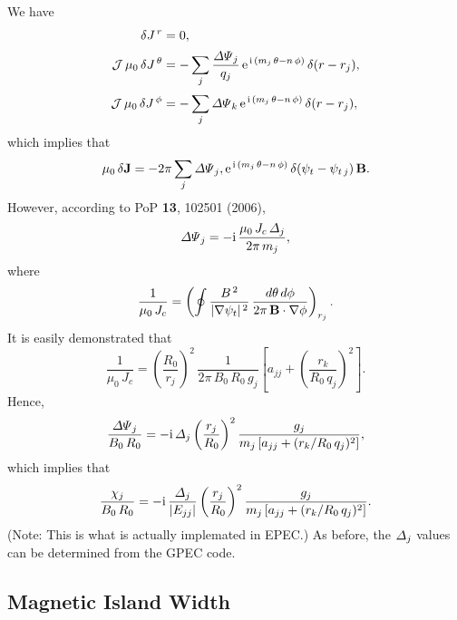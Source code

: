 \documentclass[notitlepage,12pt]{article}
\begin{document}
We have
\begin{align}
\delta J^{\,r} &= 0,\\[0.5ex]
{\cal J}\,\mu_0\,\delta J^{\,\theta} &= -\sum_j \frac{{\mit\Delta\Psi}_j}{q_j}\,{\rm e}^{\,{\rm i}\,(m_j\,\theta-n\,\phi)}\,\delta(r-r_j),\\[0.5ex]
{\cal J}\,\mu_0\,\delta J^{\,\phi} &= -\sum_j {\mit\Delta\Psi}_k\,{\rm e}^{\,{\rm i}\,(m_j\,\theta-n\,\phi)}\,\delta(r-r_j),
\end{align}
which implies that
\begin{equation}
\mu_0\,\delta{\bf J} = -2\pi\sum_j{\mit\Delta\Psi}_j,{\rm e}^{\,{\rm i}\,(m_j\,\theta-n\,\phi)}\,\delta(\psi_t-\psi_{t\,j})\,{\bf B}.
\end{equation}
However, according to PoP {\bf 13}, 102501 (2006),
\begin{equation}
{\mit\Delta\Psi}_j =- {\rm i}\,\frac{\mu_0\,J_c\,{\mit\Delta}_j}{2\pi\,m_j},
\end{equation}
where
\begin{equation}
\frac{1}{\mu_0\,J_c} = \left(\oint \frac{B^{\,2}}{|\nabla\psi_t|^{\,2}}\,\frac{d\theta\,d\phi}{2\pi\,{\bf B}\cdot\nabla\phi}\right)_{r_j}.
\end{equation}
It is easily demonstrated that
\begin{equation}
\frac{1}{\mu_0\,J_c} = \left(\frac{R_0}{r_j}\right)^2\,\frac{1}{2\pi\,B_0\,R_0\,g_j}\left[a_{jj} + \left(\frac{r_k}{R_0\,q_j}\right)^2\right].
\end{equation}
Hence,
\begin{equation}
\frac{{\mit\Delta\Psi}_j}{B_0\,R_0} = -{\rm i}\,{\mit\Delta}_j\left(\frac{r_j}{R_0}\right)^2\frac{g_j}{m_j\,[a_{jj}+ (r_k/R_0\,q_j)^2]},
\end{equation}
which implies that
\begin{equation}
\frac{\chi_j}{B_0\,R_0} = -{\rm i}\,\frac{{\mit\Delta}_j}{|E_{jj}|}\left(\frac{r_j}{R_0}\right)^2\frac{g_j}{m_j\,[a_{jj}+ (r_k/R_0\,q_j)^2]}.
\end{equation}
(Note: This is what is actually implemated in EPEC.)
As before, the ${\mit\Delta}_j$ values can be determined from the GPEC code. 

\subsection{Magnetic Island Width}
\end{document}
